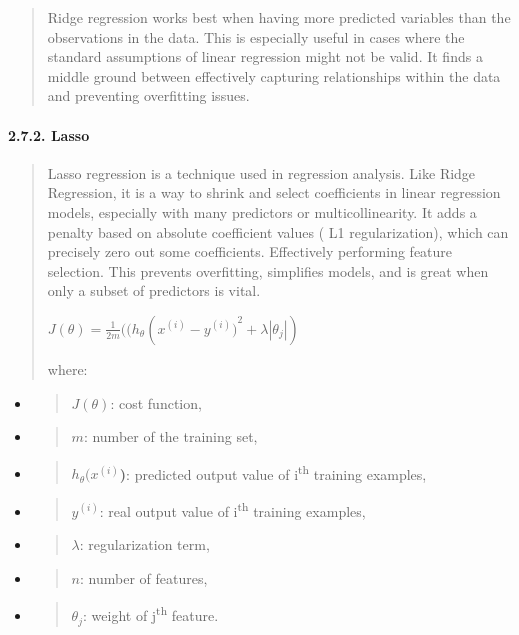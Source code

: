 \documentclass[
]{article}
\begin{document}
\begin{quote}
Ridge regression works best when having more predicted variables than
the observations in the data. This is especially useful in cases where
the standard assumptions of linear regression might not be valid. It
finds a middle ground between effectively capturing relationships within
the data and preventing overfitting issues.
\end{quote}

\hypertarget{lasso}{%
\paragraph{\texorpdfstring{\textbf{2.7.2.
Lasso}}{2.7.2. Lasso}}\label{lasso}}

\begin{quote}
Lasso regression is a technique used in regression analysis. Like Ridge
Regression, it is a way to shrink and select coefficients in linear
regression models, especially with many predictors or multicollinearity.
It adds a penalty based on absolute coefficient values ( L1
regularization), which can precisely zero out some coefficients.
Effectively performing feature selection. This prevents overfitting,
simplifies models, and is great when only a subset of predictors is
vital.

\(J(\theta) = \frac{1}{2m}((h_{\theta}(x^{(i)} - {y^{(i)})}^{2} + \lambda\left| \theta_{j} \right|)\)

where:
\end{quote}

\begin{itemize}
\item
  \begin{quote}
  \(J(\theta)\): cost function,
  \end{quote}
\item
  \begin{quote}
  \(m\): number of the training set,
  \end{quote}
\item
  \begin{quote}
  \(h_{\theta}(x^{(i)}\)\textbf{)}: predicted output value of
  i\textsuperscript{th} training examples,
  \end{quote}
\item
  \begin{quote}
  \(y^{(i)}\): real output value of i\textsuperscript{th} training
  examples,
  \end{quote}
\item
  \begin{quote}
  \(\lambda\): regularization term,
  \end{quote}
\item
  \begin{quote}
  \(n\): number of features,
  \end{quote}
\item
  \begin{quote}
  \(\theta_{j}\): weight of j\textsuperscript{th} feature.
  \end{quote}
\end{itemize}
\end{document}

